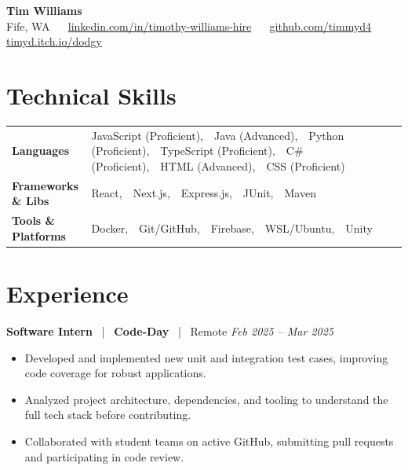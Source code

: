 \documentclass[10pt, letterpaper]{article}
\newcommand{\jobhead}[4]{%
  \vspace{5pt}%
  {\bfseries\color{dark}#1}%
  ~{\color{light}|}~%
  {\bfseries\color{navy}#2}%
  ~{\color{light}|}~%
  {\color{light}#3}%
  \hfill{\color{light}\small\textit{#4}}\\[-2pt]%
}
\newcommand{\skillrow}[2]{%
  {\bfseries #1} & #2 \\[2pt]%
}
\begin{document}

\begin{center}
  {\huge\bfseries\color{navy} Tim Williams}\\[4pt]
  {\small\color{light}
    Fife, WA
    ~\textbullet~
    \href{https://linkedin.com/in/timothy-williams-hire}{linkedin.com/in/timothy-williams-hire}
    ~\textbullet~
    \href{https://github.com/timmyd4}{github.com/timmyd4}
    ~\textbullet~
    \href{https://timyd.itch.io/dodgy}{timyd.itch.io/dodgy}
  }
\end{center}

\vspace{2pt}

\section{Technical Skills}

\begin{tabular}{@{}p{1.6in} p{5.2in}@{}}
  \skillrow{Languages}{JavaScript (Proficient),\ \ Java (Advanced),\ \ Python (Proficient),\ \ TypeScript (Proficient),\ \ C\# (Proficient),\ \ HTML (Advanced),\ \ CSS (Proficient)}
  \skillrow{Frameworks \& Libs}{React,\ \ Next.js,\ \ Express.js,\ \ JUnit,\ \ Maven}
  \skillrow{Tools \& Platforms}{Docker,\ \ Git/GitHub,\ \ Firebase,\ \ WSL/Ubuntu,\ \ Unity}
\end{tabular}

\section{Experience}

\jobhead{Software Intern}{Code-Day}{Remote}{Feb 2025 – Mar 2025}
\begin{itemize}
  \item Developed and implemented new unit and integration test cases, improving code coverage for robust applications.
  \item Analyzed project architecture, dependencies, and tooling to understand the full tech stack before contributing.
  \item Collaborated with student teams on active GitHub, submitting pull requests and participating in code review.
\end{itemize}
\end{document}
